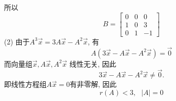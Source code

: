 所以\begin{displaymath}B=\begin{bmatrix}0&0&0\\1&0&3\\0&1&-1\end{bmatrix}\end{displaymath}
(2) 由于$A^3\vec{x}=3A\vec{x}-A^2\vec{x}$, 有$$A(3\vec{x}-A\vec{x}-A^2\vec{x})=\vec{0}$$
而向量组$\vec{x},A\vec{x},A^2\vec{x}$ 线性无关, 因此$$3\vec{x}-A\vec{x}-A^2\vec{x}\not=\vec{0}.$$
即线性方程组$A\vec{x}=0$有非零解, 因此$$r(A)<3,\ \ \  |A|=0$$

